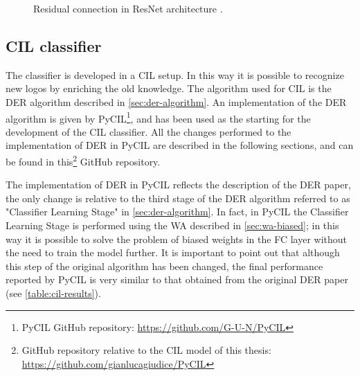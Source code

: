 \begin{figure}%
	\centering
	\hfill
	\caption{Residual connection in ResNet architecture \cite{he2016deep}.}%
	\label{fig:residual-connection}%
\end{figure}

\subsection{CIL classifier}
The classifier is developed in a CIL setup. In this way it is possible to recognize new logos by enriching the old knowledge. The algorithm used for CIL is the DER algorithm described in \autoref{sec:der-algorithm}. An implementation of the DER algorithm is given by PyCIL\footnote{PyCIL GitHub repository: \href{https://github.com/G-U-N/PyCIL}{https://github.com/G-U-N/PyCIL}}, and has been used as the starting for the development of the CIL classifier. All the changes performed to the implementation of DER in PyCIL are described in the following sections, and can be found in this\footnote{GitHub repository relative to the CIL model of this thesis: \\ \href{https://github.com/gianlucagiudice/PyCIL}{https://github.com/gianlucagiudice/PyCIL}} GitHub repository.


The implementation of DER in PyCIL reflects the description of the DER paper, the only change is relative to the third stage of the DER algorithm referred to as "Classifier Learning Stage" in \autoref{sec:der-algorithm}. In fact, in PyCIL the Classifier Learning Stage is performed using the WA described in \autoref{sec:wa-biased}; in this way it is possible to solve the problem of biased weights in the FC layer without the need to train the model further. It is important to point out that although this step of the original algorithm has been changed, the final performance reported by PyCIL is very similar to that obtained from the original DER paper (see \autoref{table:cil-results}).

